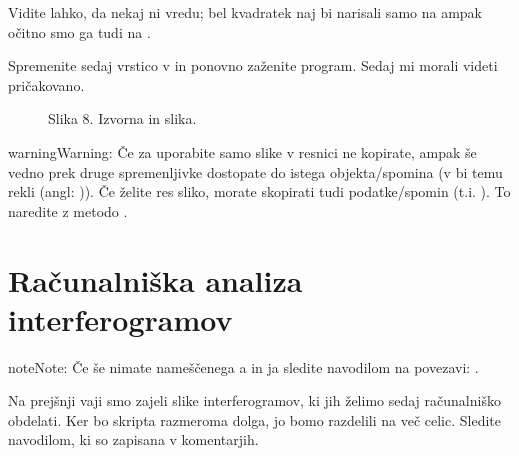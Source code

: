 \documentclass[letterpaper,10pt,english]{sphinxmanual}
\begin{document}
\sphinxAtStartPar
Vidite lahko, da nekaj ni vredu; bel kvadratek naj bi narisali samo na  ampak očitno smo ga tudi na .

\sphinxAtStartPar
Spremenite sedaj vrstico  v  in ponovno zaženite program. Sedaj mi morali videti pričakovano.

\begin{figure}[htbp]
\centering
\capstart

\noindent{}
\caption{Slika 8. Izvorna in  slika.}\label{\detokenize{uvod_py_opencv:id10}}\end{figure}

\begin{sphinxadmonition}{warning}{Warning:}
\sphinxAtStartPar
Če za  uporabite samo \sphinxcode{\sphinxupquote{=}} slike v resnici ne kopirate, ampak še vedno prek druge spremenljivke dostopate do istega objekta/spomina (v  bi temu rekli  (angl: )). Če želite res  sliko, morate skopirati tudi podatke/spomin (t.i. ). To naredite z metodo .
\end{sphinxadmonition}


\chapter{Računalniška analiza interferogramov}
\label{\detokenize{obdelava_interferogramov:racunalniska-analiza-interferogramov}}\label{\detokenize{obdelava_interferogramov:obdelava-interferogramov}}\label{\detokenize{obdelava_interferogramov::doc}}
\begin{sphinxadmonition}{note}{Note:}
\sphinxAtStartPar
Če še nimate nameščenega \sphinxhyphen{}a in \sphinxhyphen{}ja sledite navodilom na povezavi: .
\end{sphinxadmonition}

\sphinxAtStartPar
Na prejšnji vaji smo zajeli slike interferogramov, ki jih želimo sedaj računalniško obdelati. Ker bo skripta razmeroma dolga, jo bomo razdelili na več celic. Sledite navodilom, ki so zapisana v komentarjih.
\end{document}
